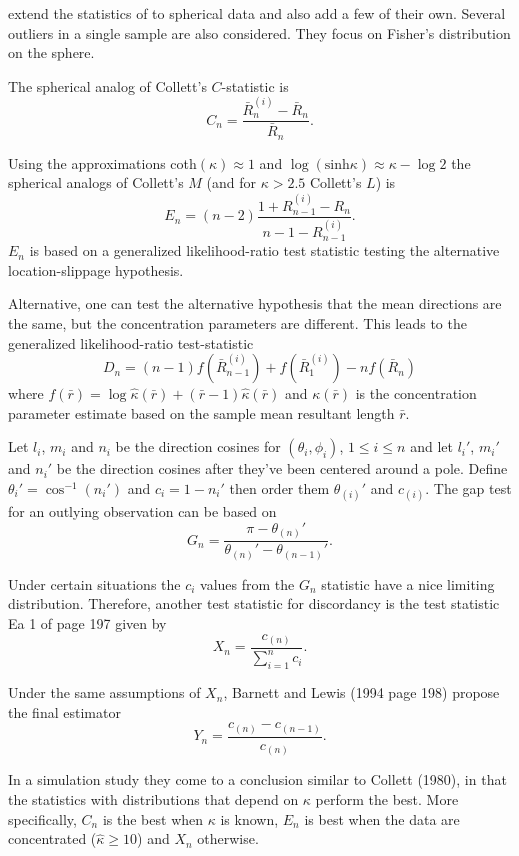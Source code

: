 \documentclass{article}\usepackage{graphicx, color}
\begin{document}
\cite{fisher1981} extend the statistics of \cite{collett1980} to spherical data and also add a few of their own.  Several outliers in a single sample are also considered.  They focus on Fisher's distribution on the sphere.

The spherical analog of Collett's $C$-statistic is
\[
C_n=\frac{\bar{R}_n^{(i)}-\bar{R}_n}{\bar{R}_n}.
\]

Using the approximations coth$(\kappa)\approx 1$ and $\log(\text{sinh}\kappa)\approx\kappa-\log 2$ the spherical analogs of Collett's $M$ (and for $\kappa>2.5$ Collett's $L$) is 
\[
E_n=(n-2)\frac{1+R_{n-1}^{(i)}-R_n}{n-1-R_{n-1}^{(i)}}.
\]
$E_n$ is based on a generalized likelihood-ratio test statistic testing the alternative location-slippage hypothesis.

Alternative, one can test the alternative hypothesis that the mean directions are the same, but the concentration parameters are different.  This leads to the generalized likelihood-ratio test-statistic
\[
D_n=(n-1)f(\bar{R}_{n-1}^{(i)})+f(\bar{R}_1^{(i)})-nf(\bar{R}_n)
\]
where $f(\bar{r})=\log\hat\kappa(\bar{r})+(\bar{r}-1)\hat\kappa(\bar{r})$ and $\kappa(\bar{r})$ is the concentration parameter estimate based on the sample mean resultant length $\bar{r}$.

Let $l_i$, $m_i$ and $n_i$ be the direction cosines for $(\theta_i,\phi_i)$, $1\leq i\leq n$ and let $l_i'$, $m_i'$ and $n_i'$ be the direction cosines after they've been centered around a pole.  Define $\theta_i'=\cos^{-1}(n_i')$ and $c_i=1-n_i'$ then order them $\theta_{(i)}'$ and $c_{(i)}$.  The gap test for an outlying observation can be based on
\[
G_n=\frac{\pi-\theta_{(n)}'}{\theta_{(n)}'-\theta_{(n-1)}'}.
\]

Under certain situations the $c_i$ values from the $G_n$ statistic have a nice limiting distribution.  Therefore, another test statistic for discordancy is the test statistic Ea 1 of  page 197 \cite{barnett1994} given by
\[
X_n=\frac{c_{(n)}}{\sum_{i=1}^nc_i}.
\]

Under the same assumptions of $X_n$, Barnett and Lewis (1994 page 198) propose the final estimator
\[
Y_n=\frac{c_{(n)}-c_{(n-1)}}{c_{(n)}}.
\]

In a simulation study they come to a conclusion similar to Collett (1980), in that the statistics with distributions that depend on $\kappa$ perform the best.  More specifically, $C_n$ is the best when $\kappa$ is known, $E_n$ is best when the data are concentrated ($\hat{\kappa}\geq 10$) and $X_n$ otherwise.
\end{document}
